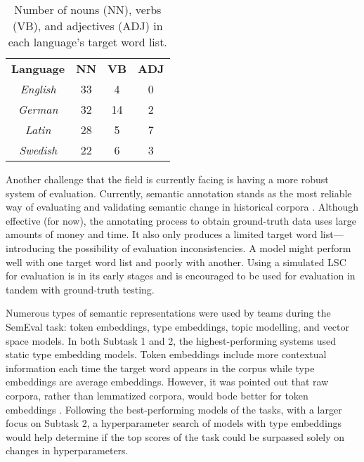 \begin{table}[h]
\centering
\begin{tabular}{cccc} 
\toprule
\textbf{Language} & \textbf{NN} & \textbf{VB} & \textbf{ADJ}  \\
\textit{English}  & 33          & 4           & 0             \\
\textit{German}   & 32          & 14          & 2             \\
\textit{Latin}    & 28          & 5           & 7             \\
\textit{Swedish}  & 22          & 6           & 3             \\
\bottomrule
\end{tabular}
\caption{Number of nouns (NN), verbs (VB), and adjectives (ADJ) in each language's target word list.}
\label{tab:postag-breakdown}
\end{table}


Another challenge that the field is currently facing is having a more robust system of evaluation. Currently, semantic annotation stands as the most reliable way of evaluating and validating semantic change in historical corpora \citep{hengchen2021challenges}. Although effective (for now), the annotating process to obtain ground-truth data uses large amounts of money and time. It also only produces a limited target word list—introducing the possibility of evaluation inconsistencies. A model might perform well with one target word list and poorly with another. Using a simulated LSC for evaluation is in its early stages and is encouraged to be used for evaluation in tandem with ground-truth testing.

Numerous types of semantic representations were used by teams during the SemEval task: token embeddings, type embeddings, topic modelling, and vector space models. In both Subtask 1 and 2, the highest-performing systems used static type embedding models. Token embeddings include more contextual information each time the target word appears in the corpus while type embeddings are average embeddings. However, it was pointed out that raw corpora, rather than lemmatized corpora, would bode better for token embeddings \citep{schlechtweg-etal-2020-semeval}. Following the best-performing models of the tasks, with a larger focus on Subtask 2, a hyperparameter search of models with type embeddings would help determine if the top scores of the task could be surpassed solely on changes in hyperparameters. 


